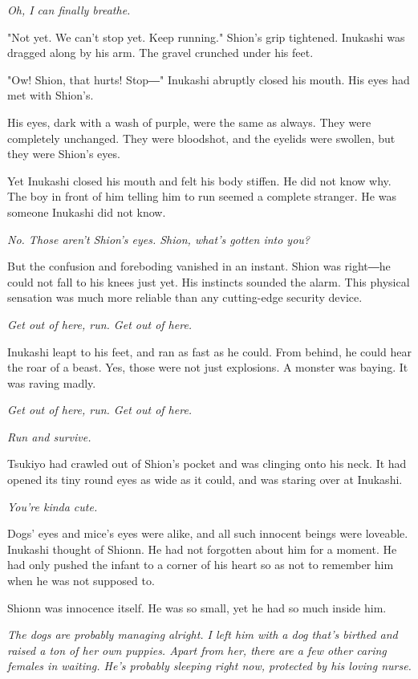\emph{Oh, I can finally breathe.}

"Not yet. We can't stop yet. Keep running." Shion's grip tightened.
Inukashi was dragged along by his arm. The gravel crunched under his
feet.

"Ow! Shion, that hurts! Stop―" Inukashi abruptly closed his mouth. His
eyes had met with Shion's.

His eyes, dark with a wash of purple, were the same as always. They were
completely unchanged. They were bloodshot, and the eyelids were swollen,
but they were Shion's eyes.

Yet Inukashi closed his mouth and felt his body stiffen. He did not know
why. The boy in front of him telling him to run seemed a complete
stranger. He was someone Inukashi did not know.

\emph{No. Those aren't Shion's eyes. Shion, what's gotten into you?}

But the confusion and foreboding vanished in an instant. Shion was
right―he could not fall to his knees just yet. His instincts sounded the
alarm. This physical sensation was much more reliable than any
cutting-edge security device.

\emph{Get out of here, run. Get out of here.}

Inukashi leapt to his feet, and ran as fast as he could. From behind, he
could hear the roar of a beast. Yes, those were not just explosions. A
monster was baying. It was raving madly.

\emph{Get out of here, run. Get out of here.}

\emph{Run and survive.}

Tsukiyo had crawled out of Shion's pocket and was clinging onto his
neck. It had opened its tiny round eyes as wide as it could, and was
staring over at Inukashi.

\emph{You're kinda cute.}

Dogs' eyes and mice's eyes were alike, and all such innocent beings were
loveable. Inukashi thought of Shionn. He had not forgotten about him for
a moment. He had only pushed the infant to a corner of his heart so as
not to remember him when he was not supposed to.

Shionn was innocence itself. He was so small, yet he had so much inside
him.

\emph{The dogs are probably managing alright. I left him with a dog that's
birthed and raised a ton of her own puppies. Apart from her, there are a
few other caring females in waiting. He's probably sleeping right now,
protected by his loving nurse.}


